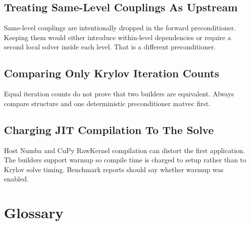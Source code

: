 \documentclass[11pt]{article}
\begin{document}
\subsection{Treating Same-Level Couplings As Upstream}

Same-level couplings are intentionally dropped in the forward preconditioner.
Keeping them would either introduce within-level dependencies or require a
second local solver inside each level.  That is a different preconditioner.

\subsection{Comparing Only Krylov Iteration Counts}

Equal iteration counts do not prove that two builders are equivalent.  Always
compare structure and one deterministic preconditioner matvec first.

\subsection{Charging JIT Compilation To The Solve}

Host Numba and CuPy RawKernel compilation can distort the first application.
The builders support warmup so compile time is charged to setup rather than to
Krylov solve timing.  Benchmark reports should say whether warmup was enabled.

\section{Glossary}
\end{document}
